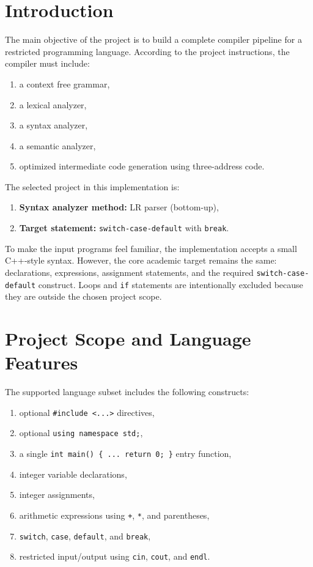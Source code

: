 \documentclass[12pt,a4paper]{article}
\begin{document}
\section{Introduction}
The main objective of the project is to build a complete compiler pipeline for a restricted programming language. According to the project instructions, the compiler must include:

\begin{enumerate}
    \item a context free grammar,
    \item a lexical analyzer,
    \item a syntax analyzer,
    \item a semantic analyzer,
    \item optimized intermediate code generation using three-address code.
\end{enumerate}

The selected project in this implementation is:

\begin{enumerate}
    \item \textbf{Syntax analyzer method:} LR parser (bottom-up),
    \item \textbf{Target statement:} \texttt{switch-case-default} with \texttt{break}.
\end{enumerate}

To make the input programs feel familiar, the implementation accepts a small C++-style syntax. However, the core academic target remains the same: declarations, expressions, assignment statements, and the required \texttt{switch-case-default} construct. Loops and \texttt{if} statements are intentionally excluded because they are outside the chosen project scope.

\section{Project Scope and Language Features}
The supported language subset includes the following constructs:

\begin{enumerate}
    \item optional \texttt{\#include <...>} directives,
    \item optional \texttt{using namespace std;},
    \item a single \texttt{int main() \{ ... return 0; \}} entry function,
    \item integer variable declarations,
    \item integer assignments,
    \item arithmetic expressions using \texttt{+}, \texttt{*}, and parentheses,
    \item \texttt{switch}, \texttt{case}, \texttt{default}, and \texttt{break},
    \item restricted input/output using \texttt{cin}, \texttt{cout}, and \texttt{endl}.
\end{enumerate}
\end{document}
